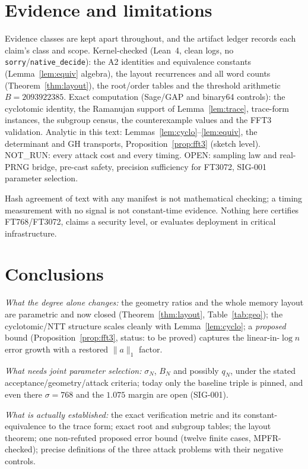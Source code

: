 \documentclass[11pt,a4paper]{article}
\theoremstyle{remark}
\newcommand{\NOTRUN}{\textsf{NOT\_RUN}}
\newcommand{\OPEN}{\textsf{OPEN}}
\begin{document}
\section{Evidence and limitations}
\label{sec:limits}

Evidence classes are kept apart throughout, and the artifact ledger records
each claim's class and scope. Kernel-checked (Lean~4, clean logs, no
\texttt{sorry}/\texttt{native\_decide}): the A2 identities and equivalence
constants (Lemma~\ref{lem:equiv} algebra), the layout recurrences and all
word counts (Theorem~\ref{thm:layout}), the root/order tables and the
threshold arithmetic $B=2093922385$. Exact computation (Sage/GAP and
binary64 controls): the cyclotomic identity, the Ramanujan support of
Lemma~\ref{lem:trace}, trace-form instances, the subgroup census, the
counterexample values and the FFT3 validation. Analytic in this text:
Lemmas~\ref{lem:cyclo}--\ref{lem:equiv}, the determinant and GH transports,
Proposition~\ref{prop:fft3} (sketch level). \NOTRUN: every attack cost and
every timing. \OPEN: sampling law and real-PRNG bridge, pre-cast safety,
precision sufficiency for FT3072, SIG-001 parameter selection.

Hash agreement of text with any manifest is not mathematical checking; a
timing measurement with no signal is not constant-time evidence. Nothing
here certifies FT768/FT3072, claims a security level, or evaluates
deployment in critical infrastructure.

\section{Conclusions}

\emph{What the degree alone changes:} the geometry ratios and the whole
memory layout are parametric and now closed (Theorem~\ref{thm:layout},
Table~\ref{tab:geo}); the cyclotomic/NTT structure scales cleanly with
Lemma~\ref{lem:cyclo}; a \emph{proposed} bound
(Proposition~\ref{prop:fft3}, status: to be proved) captures the
linear-in-$\log n$ error growth with a restored $\|a\|_1$ factor.

\emph{What needs joint parameter selection:} $\sigma_N$, $B_N$ and possibly
$q_N$, under the stated acceptance/geometry/attack criteria; today only the
baseline triple is pinned, and even there $\sigma=768$ and the $1.075$ margin
are open (SIG-001).

\emph{What is actually established:} the exact verification metric and its
constant-equivalence to the trace form; exact root and subgroup tables; the
layout theorem; one non-refuted proposed error bound (twelve finite cases,
MPFR-checked); precise definitions of the three attack problems with their
negative controls.
\end{document}
